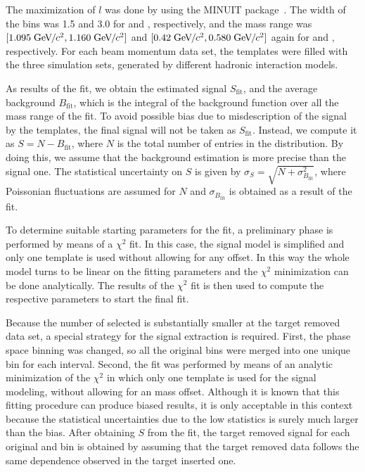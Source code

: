 The maximization of $l$ was done by using the
MINUIT package~\cite{James:1975dr}. The width
of the \minv bins was 1.5 and 3.0 \MeVcc for
\lambs and \kzeros, respectively, and the mass range
was $[1.095\;\mbox{Ge\kern-0.1em V}\kern-0.1em/\kern-0.05em c^2, 1.160\;\mbox{Ge\kern-0.1em V}\kern-0.1em/\kern-0.05em c^2]$ and $[0.42\;\mbox{Ge\kern-0.1em V}\kern-0.1em/\kern-0.05em c^2, 0.580\;\mbox{Ge\kern-0.1em V}\kern-0.1em/\kern-0.05em c^2]$  
again for \lambs and \kzeros, respectively.
For each beam momentum data set, the templates were filled
with the three simulation sets, generated by different
hadronic interaction models.

As results of the fit, we obtain the estimated signal
$S_\text{fit}$, and the average background $B_\text{fit}$, which is the integral
of the background function over all the mass range of the fit.
To avoid possible bias due to misdescription of the signal
by the templates, the final signal will not be taken as $S_\text{fit}$.
Instead, we compute it as $S = N - B_\text{fit}$,
where $N$ is the total number of entries in the \minv distribution.
By doing this, we assume that the background estimation is more precise
than the signal one.
The statistical uncertainty on $S$ is given by $\sigma_S = \sqrt{N+\sigma_{B_\text{fit}}^2}$,
where Poissonian fluctuations are assumed for $N$ and $\sigma_{B_\text{fit}}$
is obtained as a result of the fit.

To determine suitable starting parameters for the fit,
a preliminary phase is performed by means of a $\chi^2$
fit. In this case, the signal model is simplified and
only one template is used without allowing for any offset.
In this way the whole model turns to be linear on the fitting
parameters and the $\chi^2$ minimization can be done analytically.
The results of the $\chi^2$ fit
is then used to compute the respective parameters
to start the final fit.

Because the number of selected \vzeros is substantially smaller
at the target removed data set, a special strategy for the signal
extraction is required. First, the phase space binning was
changed, so all the original \pT bins were merged
into one unique bin for each \pp interval. Second, the \minv fit was performed
by means of an analytic minimization of the $\chi^2$
in which only one template is used for the signal modeling,
without allowing for an mass offset. Although it is known that this fitting
procedure can produce biased results, it is only acceptable in this
context because the statistical uncertainties due to the low
statistics is surely much larger than the bias.
After obtaining $S$ from the \minv fit, the target removed
signal for each original \pp and \pT bin is obtained by assuming
that the target removed data follows the same \pT dependence
observed in the target inserted one.


